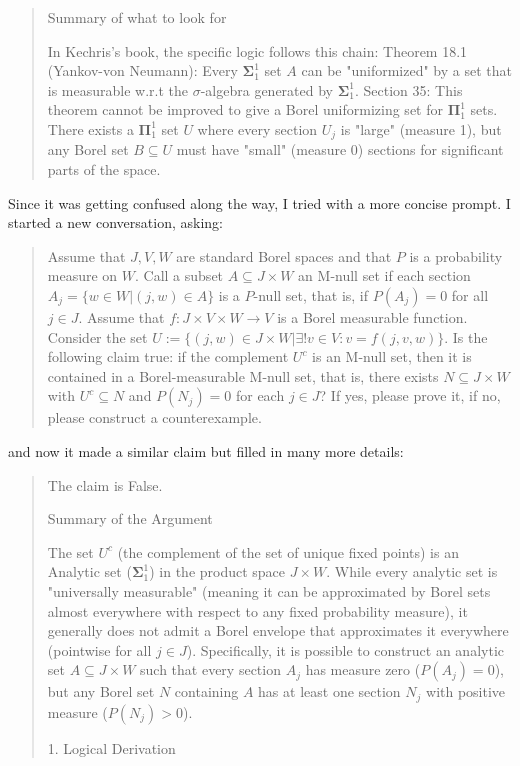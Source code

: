 \begin{Rem}
{\begin{quote}
Summary of what to look for

In Kechris's book, the specific logic follows this chain:
Theorem 18.1 (Yankov-von Neumann): Every $\mathbf{\Sigma}^1_1$ set $A$ can be "uniformized" by a set that is measurable w.r.t the $\sigma$-algebra generated by $\mathbf{\Sigma}^1_1$.
Section 35: This theorem cannot be improved to give a Borel uniformizing set for $\mathbf{\Pi}^1_1$ sets. There exists a $\mathbf{\Pi}^1_1$ set $U$ where every section $U_j$ is "large" (measure 1), but any Borel set $B \subseteq U$ must have "small" (measure 0) sections for significant parts of the space.
    \end{quote}
    Since it was getting confused along the way, I tried with a more concise prompt. I started a new conversation, asking:
    \begin{quote}
Assume that $J,V,W$ are standard Borel spaces and that $P$ is a probability measure on $W$. Call a subset $A \subseteq J \times W$ an M-null set if each section $A_j = \{ w \in W | (j,w) \in A\}$ is a $P$-null set, that is, if $P(A_j) = 0$ for all $j \in J$. Assume that $f : J \times V \times W \to V$ is a Borel measurable function. Consider the set $U := \{(j,w) \in J \times W | \exists ! v \in V : v = f(j,v,w) \}$. Is the following claim true: if the complement $U^c$ is an M-null set, then it is contained in a Borel-measurable M-null set, that is, there exists $N \subseteq J \times W$ with $U^c \subseteq N$ and $P(N_j)=0$ for each $j \in J$? If yes, please prove it, if no, please construct a counterexample.
    \end{quote}
    and now it made a similar claim but filled in many more details:
    \begin{quote}
      The claim is False.

Summary of the Argument

The set $U^c$ (the complement of the set of unique fixed points) is an Analytic set ($\mathbf{\Sigma}^1_1$) in the product space $J \times W$. While every analytic set is "universally measurable" (meaning it can be approximated by Borel sets almost everywhere with respect to any fixed probability measure), it generally does not admit a Borel envelope that approximates it everywhere (pointwise for all $j \in J$).
Specifically, it is possible to construct an analytic set $A \subseteq J \times W$ such that every section $A_j$ has measure zero ($P(A_j) = 0$), but any Borel set $N$ containing $A$ has at least one section $N_j$ with positive measure ($P(N_j) > 0$).

1. Logical Derivation


\end{quote}}
\end{Rem}
